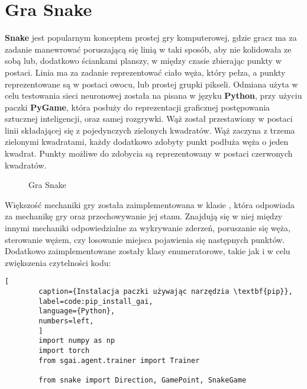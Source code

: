 


\section{Gra Snake}

\textbf{Snake} jest popularnym konceptem prostej gry komputerowej, gdzie gracz ma za zadanie manewrować poruszającą się linią w taki sposób, aby nie kolidowała ze sobą lub, dodatkowo ściankami planszy, w między czasie zbierając punkty w postaci. Linia ma za zadanie reprezentować ciało węża, który pełza, a punkty reprezentowane są w postaci owocu, lub prostej grupki pikseli.
Odmiana użyta w celu testowania sieci neuronowej została na pisana w języku \textbf{Python}, przy użyciu paczki \textbf{PyGame}, która posłuży do reprezentacji graficznej postępowania sztucznej inteligencji, oraz samej rozgrywki.
Wąż został przestawiony w postaci linii składającej się z pojedynczych zielonych kwadratów. Wąż zaczyna z trzema zielonymi kwadratami, każdy dodatkowo zdobyty punkt podłuża węża o jeden kwadrat. Punkty możliwe do zdobycia są reprezentowany w postaci czerwonych kwadratów.

\begin{figure}[h!]
    \centering
    \caption{Gra Snake}
    \label{img:snake_game}
\end{figure}

\clearpage

Większość mechaniki gry została zaimplementowana w klasie , która odpowiada za mechanikę gry oraz przechowywanie jej stanu. Znajdują się w niej między innymi mechaniki odpowiedzialne za wykrywanie zderzeń, poruszanie się węża, sterowanie wężem, czy losowanie miejsca pojawienia się następnych punktów. Dodatkowo zaimplementowane zostały klasy enumeratorowe, takie jak  i  w celu zwiększenia czytelności kodu:

\begin{onepage}
    \begin{lstlisting}[
        caption={Instalacja paczki używając narzędzia \textbf{pip}},
        label=code:pip_install_gai,
        language={Python},
        numbers=left,
        ]
        import numpy as np
        import torch
        from sgai.agent.trainer import Trainer
        
        from snake import Direction, GamePoint, SnakeGame
    \end{lstlisting}
\end{onepage}



